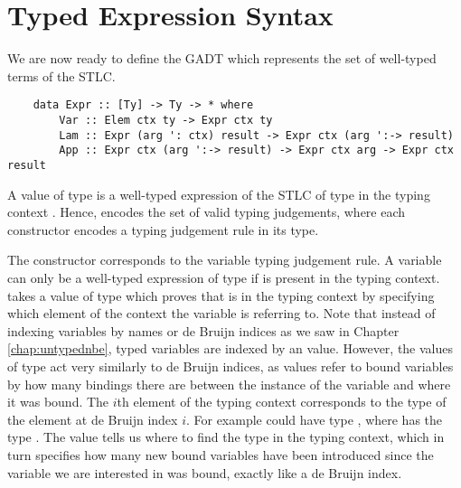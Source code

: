 
\section{Typed Expression Syntax}
\label{sect:typedsyntax}

We are now ready to define the  GADT which represents the set of well-typed terms of the STLC.

\begin{lstlisting}
    data Expr :: [Ty] -> Ty -> * where
        Var :: Elem ctx ty -> Expr ctx ty
        Lam :: Expr (arg ': ctx) result -> Expr ctx (arg ':-> result)
        App :: Expr ctx (arg ':-> result) -> Expr ctx arg -> Expr ctx result 
\end{lstlisting}

A value of type  is a well-typed expression of the STLC of type  in the typing context . Hence,  encodes the set of valid typing judgements, where each constructor encodes a typing judgement rule in its type.

The  constructor corresponds to the variable typing judgement rule. A variable can only be a well-typed expression of type  if  is present in the typing context.  takes a value of type  which proves that  is in the typing context  by specifying which element of the context the variable is referring to.
Note that instead of indexing variables by names or de Bruijn indices as we saw in Chapter \ref{chap:untypednbe}, typed variables are indexed by an  value. However, the values of type  act very similarly to de Bruijn indices, as  values refer to bound variables by how many bindings there are between the instance of the variable and where it was bound. The $i$th element of the typing context corresponds to the type of the element at de Bruijn index $i$. For example  could have type , where  has the type . The  value tells us where to find the type in the typing context, which in turn specifies how many new bound variables have been introduced since the variable we are interested in was bound, exactly like a de Bruijn index.

